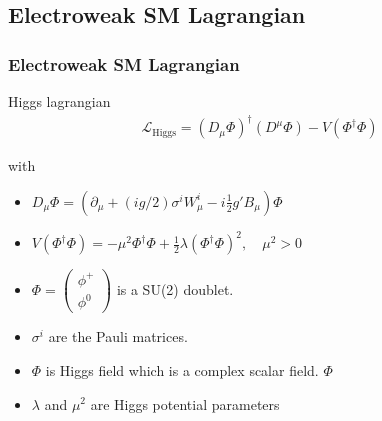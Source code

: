 \documentclass[11pt]{beamer}
\begin{document}
\begin{frame}
\subsection{Electroweak SM Lagrangian}
\frametitle{Electroweak SM Lagrangian}
Higgs lagrangian 
\begin{align}
\mathcal{L}_{\text{Higgs}}=(D_\mu \Phi)^\dagger (D^\mu \Phi)-V(\Phi^\dagger \Phi)
\end{align}

with
\begin{itemize}
	\item $D_\mu \Phi = \left(\partial_\mu+(ig/2)\sigma^iW^i_\mu-i\frac{1}{2} g' B_\mu \right) \Phi $
	\item $V(\Phi^\dagger \Phi)=-\mu^2 \Phi^\dagger \Phi +\frac{1}{2}  \lambda (\Phi^\dagger \Phi)^2, \quad \mu^2>0  $ 
	\item $\Phi=\left(\begin{array}{c}
	\phi^+ \\
	\phi^0
	\end{array} \right)  $ is a SU(2) doublet.
	\item $\sigma^i$ are the Pauli matrices.
\end{itemize}
 
\begin{itemize}
	\item $\Phi$ is Higgs field which is a complex scalar field. $\Phi$
	\item $\lambda $ and $\mu^2$ are Higgs potential parameters
\end{itemize}
\end{frame}
\end{document}
